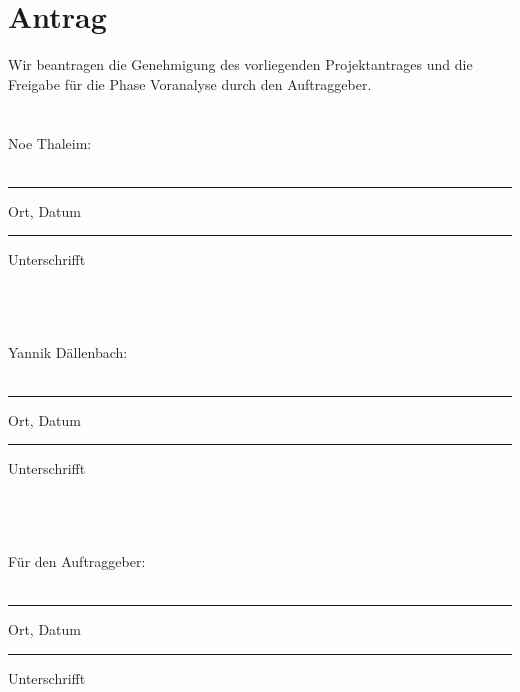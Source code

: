 \documentclass{scrartcl}
\begin{document}
	
	\section{Antrag}
	Wir beantragen die Genehmigung des vorliegenden Projektantrages und die Freigabe für die Phase Voranalyse durch den Auftraggeber.
	\\ \\ \\
	Noe Thaleim:
	\\ \\
	\parbox{4cm}{\hrule
	\strut \centering\footnotesize Ort, Datum} \hfill\parbox{4cm}{\hrule
	\strut \centering\footnotesize Unterschrifft}
	\\ \\ \\
	Yannik Dällenbach:
	\\ \\
	\parbox{4cm}{\hrule
	\strut \centering\footnotesize Ort, Datum} \hfill\parbox{4cm}{\hrule
	\strut \centering\footnotesize Unterschrifft}
	\\ \\ \\
	Für den Auftraggeber:
	\\ \\
	\parbox{4cm}{\hrule
	\strut \centering\footnotesize Ort, Datum} \hfill\parbox{4cm}{\hrule
	\strut \centering\footnotesize Unterschrifft}
	
\end{document}
